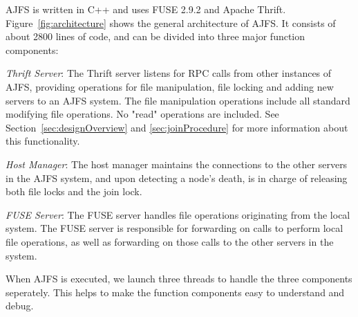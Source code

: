 AJFS is written in C++ and uses FUSE 2.9.2 and Apache Thrift.
Figure~\ref{fig:architecture} shows the general architecture of AJFS. It
consists of about 2800 lines of code, and can be divided into three major
function components:

\emph{Thrift Server}: The Thrift server listens for RPC calls from other
instances of AJFS, providing operations for file manipulation, file locking and
adding new servers to an AJFS system. The file manipulation operations include
all standard modifying file operations. No "read" operations are included.
See Section~\ref{sec:designOverview} and \ref{sec:joinProcedure} for more
information about this functionality.

\emph{Host Manager}: The host manager maintains the connections to the other
servers in the AJFS system, and upon detecting a node's death, is in charge of
releasing both file locks and the join lock.

\emph{FUSE Server}: The FUSE server handles file operations originating from the
local system. The FUSE server is responsible for forwarding on calls to
perform local file operations, as well as forwarding on those calls to the other
servers in the system.

When AJFS is executed, we launch three threads to handle the three components
seperately. This helps to make the function components easy to understand and
debug.

